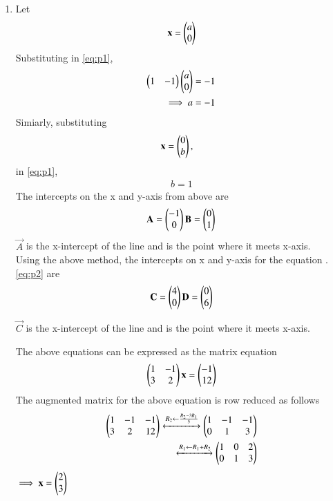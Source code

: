 \renewcommand{\theequation}{\theenumi}
\begin{enumerate}[label=\arabic*.,ref=\thesubsection.\theenumi]

\item Let 
\begin{align}
\mathbf{x} = \begin{pmatrix}a\\0\end{pmatrix}
\end{align}
%
Substituting in \eqref{eq:p1}, 
%
\begin{align}
\begin{pmatrix}1 & -1\end{pmatrix} \begin{pmatrix}a\\0\end{pmatrix}&= -1
\\
\implies a &=-1
\end{align}
%
Simiarly, substituting 
%
\begin{align}
\mathbf{x} &= \begin{pmatrix}0\\b\end{pmatrix},
\end{align}
%
in \eqref{eq:p1}, 
%
%
\begin{align}
b =1
\end{align}
%
The intercepts on the x and y-axis from above are 
\begin{align}
\mathbf{A} = \begin{pmatrix}-1\\0\end{pmatrix}
\mathbf{B} = \begin{pmatrix}0\\1\end{pmatrix}
\end{align}
\label{eq:p1xaxis}
$\vec{A}$ is the x-intercept of the line and is the point where it meets x-axis.
\\
Using the above method, the intercepts on x and y-axis for the equation .\eqref{eq:p2} are
\begin{align}
\mathbf{C} = \begin{pmatrix}4\\0\end{pmatrix}
\mathbf{D} = \begin{pmatrix}0\\6\end{pmatrix}
\end{align}

\label{eq:p2xaxis}
$\vec{C}$ is the x-intercept of the line and is the point where it meets x-axis.

The above equations can be expressed as the matrix equation
\begin{align}
\begin{pmatrix}1 & -1\\3 & 2\end{pmatrix} \mathbf{x} = \begin{pmatrix}-1\\12\end{pmatrix}
\end{align}
%
The augmented matrix for the above equation is row reduced as follows
\begin{align}
\begin{pmatrix}1 & -1 & -1\\3 & 2 & 12\end{pmatrix} 
\xleftrightarrow {R_2\leftarrow \frac{R_2-3R_1}{5}}\begin{pmatrix}1 & -1 & -1\\0 & 1 & 3\end{pmatrix} 
\\
\xleftrightarrow {R_1\leftarrow R_1 + R_2}\begin{pmatrix}1 & 0 & 2\\0 & 1 & 3\end{pmatrix} 
\label{eq:line_aug}
\end{align}
%
$\implies \mathbf{x}=\begin{pmatrix}2\\3\end{pmatrix}$


\end{enumerate}
